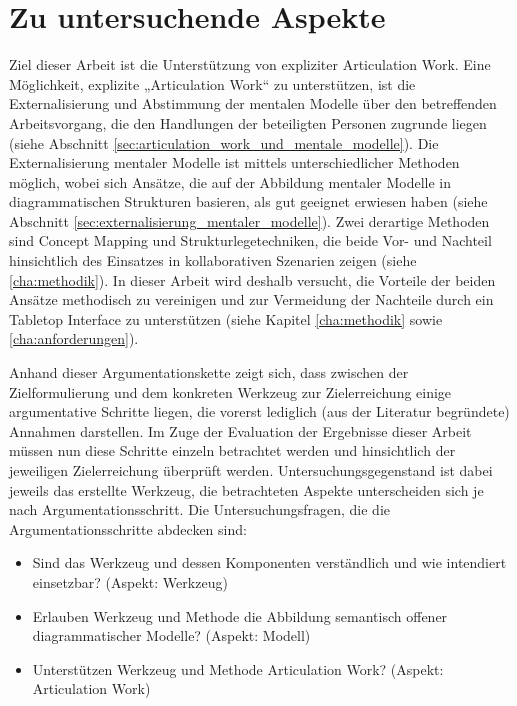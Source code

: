 \section{Zu untersuchende Aspekte} %
\label{sec:untersuchungsaspekte}

Ziel dieser Arbeit ist die Unterstützung von expliziter Articulation Work. Eine Möglichkeit, explizite „Articulation Work“ zu unterstützen, ist die Externalisierung und Abstimmung der mentalen Modelle über den betreffenden Arbeitsvorgang, die den Handlungen der beteiligten Personen zugrunde liegen (siehe Abschnitt \ref{sec:articulation_work_und_mentale_modelle}). Die Externalisierung mentaler Modelle ist mittels unterschiedlicher Methoden möglich, wobei sich Ansätze, die auf der Abbildung mentaler Modelle in diagrammatischen Strukturen basieren, als gut geeignet erwiesen haben (siehe Abschnitt \ref{sec:externalisierung_mentaler_modelle}). Zwei derartige Methoden sind Concept Mapping und Strukturlegetechniken, die beide Vor- und Nachteil hinsichtlich des Einsatzes in kollaborativen Szenarien zeigen (siehe \ref{cha:methodik}). In dieser Arbeit wird deshalb versucht, die Vorteile der beiden Ansätze methodisch zu vereinigen und zur Vermeidung der Nachteile durch ein Tabletop Interface zu unterstützen (siehe Kapitel \ref{cha:methodik} sowie \ref{cha:anforderungen}).

Anhand dieser Argumentationskette zeigt sich, dass zwischen der Zielformulierung und dem konkreten Werkzeug zur Zielerreichung einige argumentative Schritte liegen, die vorerst lediglich (aus der Literatur begründete) Annahmen darstellen. Im Zuge der Evaluation der Ergebnisse dieser Arbeit müssen nun diese Schritte einzeln betrachtet werden und hinsichtlich der jeweiligen Zielerreichung überprüft werden. Untersuchungsgegenstand ist dabei jeweils das erstellte Werkzeug, die betrachteten Aspekte unterscheiden sich je nach Argumentationsschritt. Die Untersuchungsfragen, die die Argumentationsschritte abdecken sind:
\begin{itemize}
 \item Sind das Werkzeug und dessen Komponenten verständlich und wie intendiert einsetzbar? (Aspekt: Werkzeug)
 \item Erlauben Werkzeug und Methode die Abbildung semantisch offener diagrammatischer Modelle? (Aspekt: Modell)
 \item Unterstützen Werkzeug und Methode Articulation Work? (Aspekt: Articulation Work)
\end{itemize}


